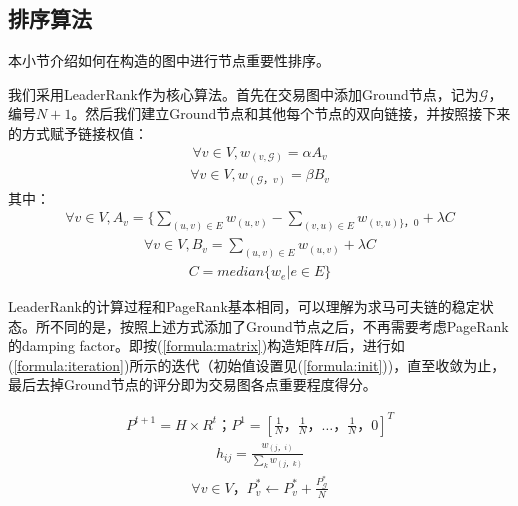 \subsection{排序算法} \label{subsec:leaderrank}
本小节介绍如何在构造的图中进行节点重要性排序。

我们采用LeaderRank\cite{Chen2013}\cite{Li2014}作为核心算法。首先在交易图中添加Ground节点，记为$\mathcal{G}$，编号$N+1$。然后我们建立Ground节点和其他每个节点的双向链接，并按照接下来的方式赋予链接权值：
\begin{align}\label{formula:weight1}
	\forall v \in V, w_{(v, \mathcal{G})} = \alpha A_v
\end{align}
\begin{align}\label{formula:weight2}
\forall v \in V,  w_{(\mathcal{G}， v)} = \beta B_v
\end{align}
其中：
\begin{align}
	\forall v \in V, A_v = \{ \sum_{(u,v)\in E} w_{(u,v)} - \sum_{(v,u) \in E} w_{(v, u) \}， 0 } + \lambda C
\end{align}
\begin{align} \label{formula:b}
\forall v \in V,  B_v =  \sum_{(u,v) \in E} w_{(u,v)} + \lambda C
\end{align}
\begin{align}
	C = median\{w_e| e \in E\}
\end{align}

LeaderRank的计算过程和PageRank基本相同，可以理解为求马可夫链的稳定状态。所不同的是，按照上述方式添加了Ground节点之后，不再需要考虑PageRank的damping factor\cite{Brin2010}\cite{page1999pagerank}。即按(\ref{formula:matrix})构造矩阵$H$后，进行如(\ref{formula:iteration})所示的迭代（初始值设置见(\ref{formula:init}))，直至收敛为止，最后去掉Ground节点的评分即为交易图各点重要程度得分。

\begin{align} \label{formula:iteration}
	P^{t+1} = H \times R^{t}； P^1=[\frac{1}{N}， \frac{1}{N}， \dots， \frac{1}{N}， 0]^T
\end{align}
\begin{align} \label{formula:matrix}
	h_{ij} = \frac{w_{(j，i)}}{\sum_k w_{(j，k)}}
\end{align}
\begin{align} \label{formula:init}
\forall v \in V， P^*_v \leftarrow P^*_v + \frac{P^*_{\mathcal{G}}}{N}
\end{align}


